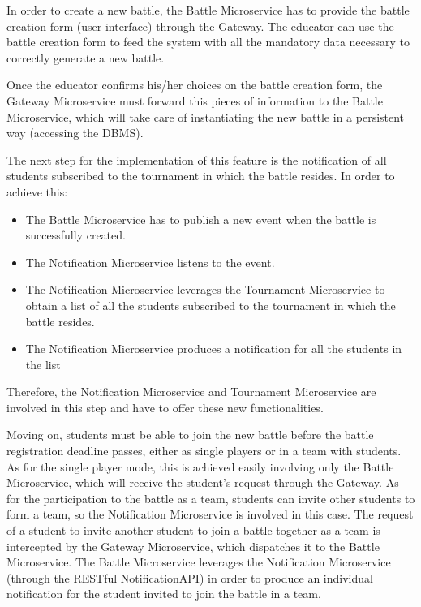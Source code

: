 In order to create a new battle, the Battle Microservice has to provide the battle creation form (user interface) through the Gateway. The educator can use the battle creation form to feed the system with all the mandatory data necessary to correctly generate a new battle.

Once the educator confirms his/her choices on the battle creation form, the Gateway Microservice must forward this pieces of information to the Battle Microservice, which will take care of instantiating the new battle in a persistent way (accessing the DBMS).

The next step for the implementation of this feature is the notification of all students subscribed to the tournament in which the battle resides. In order to achieve this:
\begin{itemize}
	\item The Battle Microservice has to publish a new event when the battle is successfully created.
	\item The Notification Microservice listens to the event.
	\item The Notification Microservice leverages the Tournament Microservice to obtain a list of all the students subscribed to the tournament in which the battle resides.
	\item The Notification Microservice produces a notification for all the students in the list
\end{itemize}

Therefore, the Notification Microservice and Tournament Microservice are involved in this step and have to offer these new functionalities.

Moving on, students must be able to join the new battle before the battle registration deadline passes, either as single players or in a team with students. As for the single player mode, this is achieved easily involving only the Battle Microservice, which will receive the student's request through the Gateway.
As for the participation to the battle as a team, students can invite other students to form a team, so the Notification Microservice is involved in this case. The request of a student to invite another student to join a battle together as a team is intercepted by the Gateway Microservice, which dispatches it to the Battle Microservice. The Battle Microservice leverages the Notification Microservice (through the RESTful NotificationAPI) in order to produce an individual notification for the student invited to join the battle in a team.

